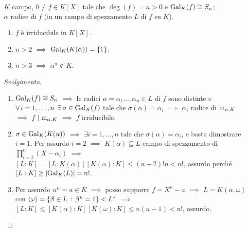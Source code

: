 \begin{eser}
\(K\) campo, \(0\ne f\in K[X]\) tale che \(\deg(f)=n>0\) e \(\Gal[K]{f}\iso S_n\); \\
\(\alpha\) radice di \(f\) (in un campo di spezzamento \(L\) di \(f\) su \(K\)).
\begin{enumerate}
\item \(f\) è irriducibile in \(K[X]\).
\item \(n>2\) \(\implies\) \(\Gal[K]{K(\alpha)}=\{1\}\).
\item \(n>3\) \(\implies\) \(\alpha^n\not\in K\).
\end{enumerate}
\end{eser}

\begin{proof}[Svolgimento]
\begin{enumerate}
\item \(\Gal[K]{f}\iso S_n\) \(\implies\) le radici \(\alpha=\alpha_1\dots,\alpha_n\in L\) di \(f\) sono distinte e \(\all i=1,\dots,n\) \(\exi\sigma\in\Gal[K]{f}\) tale che \(\sigma(\alpha)=\alpha_i\) \(\implies\) \(\alpha_i\) radice di \(\polmin_{\alpha,K}\) \(\implies\) \(f\dvd\polmin_{\alpha,K}\) \(\implies\) \(f\) irriducibile.
\item \(\sigma\in\Gal[K]{K(\alpha)}\) \(\implies\) \(\exi i=1,\dots,n\) tale che \(\sigma(\alpha)=\alpha_i\), e basta dimostrare \(i=1\). Per assurdo \(i=2\) \(\implies\) \(K(\alpha)\subseteq L\) campo di spezzamento di \(\prod_{i=3}^n(X-\alpha_i)\) \(\implies\) \([L:K]=[L:K(\alpha)][K(\alpha):K]\le(n-2)!n<n!\), assurdo perché \([L:K]\ge\card{\Gal[K]{L}}=n!\).
\item Per assurdo \(\alpha^n=a\in K\) \(\implies\) posso supporre \(f=X^n-a\) \(\implies\) \(L=K(\alpha,\omega)\) con \(\gen{\omega}=\{\beta\in L\st\beta^n=1\}<L^*\) \(\implies\) \([L:K]\le[K(\alpha):K][K(\omega):K]\le n(n-1)<n!\), assurdo. \qedhere
\end{enumerate}
\end{proof}


